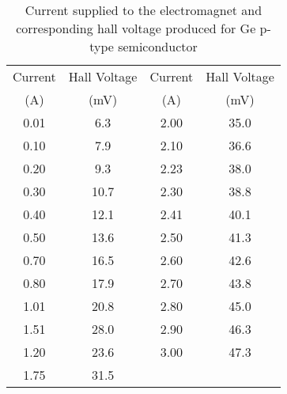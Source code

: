 \begin{table}[H]
    \centering
    \begin{tabular}{|c|c|c|c|}
    \hline
    Current & Hall Voltage & Current & Hall Voltage \\ 
    (A) & (mV) & (A) & (mV) \\ \hline
    0.01 & 6.3 & 2.00 & 35.0 \\ \hline
    0.10 & 7.9 & 2.10 & 36.6 \\ \hline
    0.20 & 9.3 & 2.23 & 38.0 \\ \hline
    0.30 & 10.7 & 2.30 & 38.8 \\ \hline
    0.40 & 12.1 & 2.41 & 40.1 \\ \hline
    0.50 & 13.6 & 2.50 & 41.3 \\ \hline
    0.70 & 16.5 & 2.60 & 42.6 \\ \hline
    0.80 & 17.9 & 2.70 & 43.8 \\ \hline
    1.01 & 20.8 & 2.80 & 45.0 \\ \hline
    1.51 & 28.0 & 2.90 & 46.3 \\ \hline
    1.20 & 23.6 & 3.00 & 47.3 \\ \hline
    1.75 & 31.5 &  &  \\ \hline
    \end{tabular}
    \caption{Current supplied to the electromagnet and
    corresponding hall voltage produced for Ge p-type
    semiconductor}
    \label{tab:geP}
\end{table}